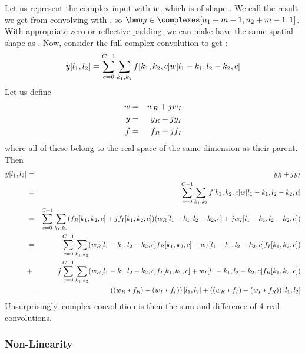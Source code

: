   Let us represent the complex input with $\SigIn$, which is of shape
  \complexes[n_1\x n_2\x C]. We call \SigOut the result we get from convolving
  \SigInB with \FilterB, so $\SigOutB \in \complexes[n_1 + m - 1, n_2 + m -1, 1]$. With
  appropriate zero or reflective padding, we can make \SigOut have the same
  spatial shape as \SigInB. Now, consider the full complex convolution to get
  \SigOut:
  $$ \SigOut[l_1,l_2] = \sum_{c=0}^{C-1} \sum_{k_1,k_2}
  \Filter[k_1,k_2,c] \SigIn[l_1-k_1,l_2-k_2,c]$$
  Let us define 
  \begin{eqnarray*}
    \SigIn & = & \SigIn_R +j\SigIn_I \\
    \SigOut & = & \SigOut_R +j\SigOut_I \\
    \Filter & = & \Filter_R + j\Filter_I
  \end{eqnarray*}
  where all of these belong to the real space of the same dimension as their
  parent. Then
  \begin{eqnarray*}
    \SigOut[l_1, l_2] & = &  \SigOut_R +j\SigOut_I \\
        & = &\sum_{c=0}^{C-1} \sum_{k_1,k_2} \Filter[k_1,k_2,c] \SigIn[l_1-k_1,l_2-k_2,c]\\
        & = &\sum_{c=0}^{C-1} \sum_{k_1,k_2} (\Filter_R[k_1,k_2,c] +j\Filter_I[k_1,k_2,c]) 
          (\SigIn_R[l_1-k_1,l_2-k_2,c]+ j\SigIn_I[l_1-k_1,l_2-k_2,c])\\
        & = & \sum_{c=0}^{C-1} \sum_{k_1,k_2} (
            \SigIn_R[l_1-k_1,l_2-k_2,c] \Filter_R[k_1,k_2,c] - 
            \SigIn_I[l_1-k_1,l_2-k_2,c] \Filter_I[k_1,k_2,c]) \\
        & +& j\sum_{c=0}^{C-1} \sum_{k_1,k_2} (\SigIn_R[l_1-k_1,l_2-k_2,c] \Filter_I[k_1,k_2,c] + 
            \SigIn_I[l_1-k_1,l_2-k_2,c] \Filter_R[k_1,k_2,c]) \\
        &=& \left((\SigIn_R \ast \Filter_R) - (\SigIn_I \ast \Filter_I)\right)[l_1,l_2] + 
            \left((\SigIn_R \ast \Filter_I) + (\SigIn_I \ast \Filter_R)\right)[l_1,l_2]
  \end{eqnarray*}
  Unsurprisingly, complex convolution is then the sum and difference of 4 real convolutions.

\subsubsection*{Non-Linearity}
  \renewcommand{\SigIn}{\ensuremath{w}\xspace}
  \renewcommand{\SigOut}{\ensuremath{y}\xspace}

